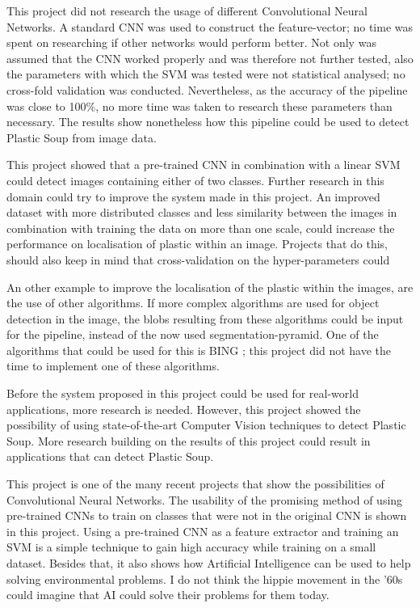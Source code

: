 This project did not research the usage of different Convolutional Neural Networks.
A standard CNN was used to construct the feature-vector; no time was spent on researching if other networks would perform better.
Not only was assumed that the CNN worked properly and was therefore not further tested, also the parameters with which the SVM was tested were not statistical analysed; no cross-fold validation was conducted.
Nevertheless, as the accuracy of the pipeline was close to 100\%, no more time was taken to research these parameters than necessary.
The results show nonetheless how this pipeline could be used to detect Plastic Soup from image data.

This project showed that a pre-trained CNN in combination with a linear SVM could detect images containing either of two classes.
Further research in this domain could try to improve the system made in this project.
An improved dataset with more distributed classes and less similarity between the images in combination with training the data on more than one scale, could increase the performance on localisation of plastic within an image.
Projects that do this, should also keep in mind that cross-validation on the hyper-parameters could 

An other example to improve the localisation of the plastic within the images, are the use of other algorithms.
If more complex algorithms are used for object detection in the image, the blobs resulting from these algorithms could be input for the pipeline, instead of the now used segmentation-pyramid.
One of the algorithms that could be used for this is BING \citep{BingObj2014}; this project did not have the time to implement one of these algorithms.

Before the system proposed in this project could be used for real-world applications, more research is needed.
However, this project showed the possibility of using state-of-the-art Computer Vision techniques to detect Plastic Soup.
More research building on the results of this project could result in applications that can detect Plastic Soup.

This project is one of the many recent projects that show the possibilities of Convolutional Neural Networks.
The usability of the promising method of using pre-trained CNNs to train on classes that were not in the original CNN is shown in this project.
Using a pre-trained CNN as a feature extractor and training an SVM is a simple technique to gain high accuracy while training on a small dataset.
Besides that, it also shows how Artificial Intelligence can be used to help solving environmental problems.
I do not think the hippie movement in the '60s could imagine that AI could solve their problems for them today.

